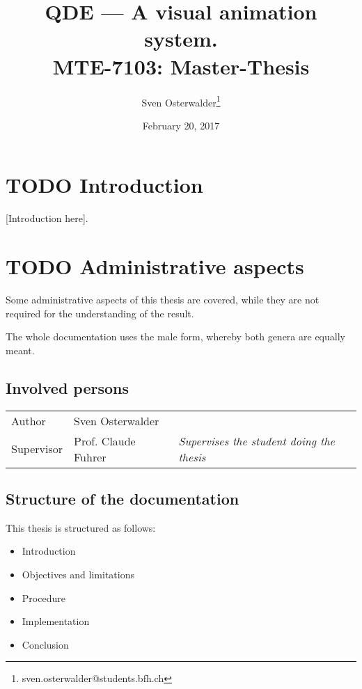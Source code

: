 \documentclass[10pt, openright, notitlepage]{scrreprt}
\author{Sven Osterwalder\thanks{sven.osterwalder@students.bfh.ch}}
\date{February 20, 2017}
\title{QDE --- A visual animation system.\\\medskip
\large MTE-7103: Master-Thesis}
\begin{document}
\maketitle
\tableofcontents


\chapter{{\bfseries\sffamily TODO} Introduction}
\label{sec:orgeccb199}

[Introduction here].

\chapter{{\bfseries\sffamily TODO} Administrative aspects}
\label{sec:org2ed9020}

Some administrative aspects of this thesis are covered, while they are not
required for the understanding of the result.

The whole documentation uses the male form, whereby both genera are equally
meant.

\section{Involved persons}
\label{sec:org886fbb7}

\begin{center}
\begin{tabular}{lll}
Author & Sven Osterwalder\footnotemark & \\
Supervisor & Prof. Claude Fuhrer\footnotemark & \emph{Supervises the student doing the thesis}\\
\end{tabular}
\end{center}

\section{Structure of the documentation}
\label{sec:orgcd70a95}

This thesis is structured as follows:

\begin{itemize}
\item Introduction
\item Objectives and limitations
\item Procedure
\item Implementation
\item Conclusion
\end{itemize}
\end{document}
